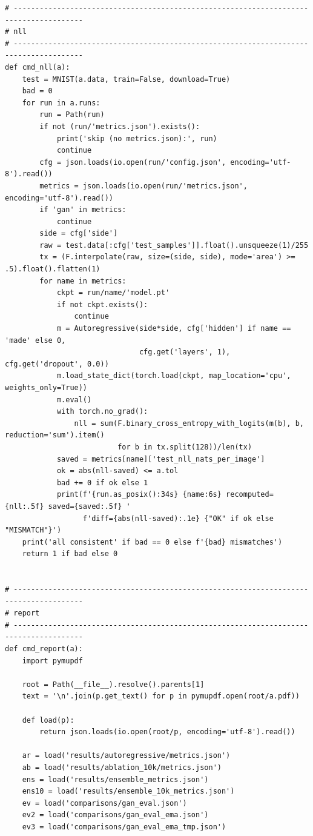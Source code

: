 \begin{lstlisting}
# --------------------------------------------------------------------------------------
# nll
# --------------------------------------------------------------------------------------
def cmd_nll(a):
    test = MNIST(a.data, train=False, download=True)
    bad = 0
    for run in a.runs:
        run = Path(run)
        if not (run/'metrics.json').exists():
            print('skip (no metrics.json):', run)
            continue
        cfg = json.loads(io.open(run/'config.json', encoding='utf-8').read())
        metrics = json.loads(io.open(run/'metrics.json', encoding='utf-8').read())
        if 'gan' in metrics:
            continue
        side = cfg['side']
        raw = test.data[:cfg['test_samples']].float().unsqueeze(1)/255
        tx = (F.interpolate(raw, size=(side, side), mode='area') >= .5).float().flatten(1)
        for name in metrics:
            ckpt = run/name/'model.pt'
            if not ckpt.exists():
                continue
            m = Autoregressive(side*side, cfg['hidden'] if name == 'made' else 0,
                               cfg.get('layers', 1), cfg.get('dropout', 0.0))
            m.load_state_dict(torch.load(ckpt, map_location='cpu', weights_only=True))
            m.eval()
            with torch.no_grad():
                nll = sum(F.binary_cross_entropy_with_logits(m(b), b, reduction='sum').item()
                          for b in tx.split(128))/len(tx)
            saved = metrics[name]['test_nll_nats_per_image']
            ok = abs(nll-saved) <= a.tol
            bad += 0 if ok else 1
            print(f'{run.as_posix():34s} {name:6s} recomputed={nll:.5f} saved={saved:.5f} '
                  f'diff={abs(nll-saved):.1e} {"OK" if ok else "MISMATCH"}')
    print('all consistent' if bad == 0 else f'{bad} mismatches')
    return 1 if bad else 0


# --------------------------------------------------------------------------------------
# report
# --------------------------------------------------------------------------------------
def cmd_report(a):
    import pymupdf

    root = Path(__file__).resolve().parents[1]
    text = '\n'.join(p.get_text() for p in pymupdf.open(root/a.pdf))

    def load(p):
        return json.loads(io.open(root/p, encoding='utf-8').read())

    ar = load('results/autoregressive/metrics.json')
    ab = load('results/ablation_10k/metrics.json')
    ens = load('results/ensemble_metrics.json')
    ens10 = load('results/ensemble_10k_metrics.json')
    ev = load('comparisons/gan_eval.json')
    ev2 = load('comparisons/gan_eval_ema.json')
    ev3 = load('comparisons/gan_eval_ema_tmp.json')


\end{lstlisting}
